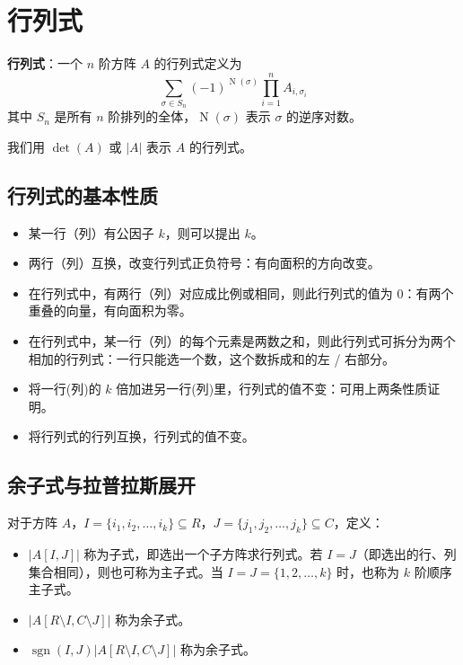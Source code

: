\section{行列式}

\begin{tcolorbox}
    \textbf{行列式}：一个 $n$ 阶方阵 $A$ 的行列式定义为
    $$\sum_{\sigma\in S_n} (-1)^{\operatorname{N}(\sigma)}\prod_{i=1}^{n} A_{i,\sigma_i}$$
    其中 $S_n$ 是所有 $n$ 阶排列的全体，$\operatorname{N}(\sigma)$ 表示 $\sigma$ 的逆序对数。

    我们用 $\det(A)$ 或 $|A|$ 表示 $A$ 的行列式。
\end{tcolorbox}

\subsection{行列式的基本性质}

\begin{itemize}
    \item 某一行（列）有公因子 $k$，则可以提出 $k$。
    \item 两行（列）互换，改变行列式正负符号：有向面积的方向改变。
    \item 在行列式中，有两行（列）对应成比例或相同，则此行列式的值为 $0$：有两个重叠的向量，有向面积为零。
    \item 在行列式中，某一行（列）的每个元素是两数之和，则此行列式可拆分为两个相加的行列式：一行只能选一个数，这个数拆成和的左 / 右部分。
    \item 将一行(列)的 $k$ 倍加进另一行(列)里，行列式的值不变：可用上两条性质证明。
    \item 将行列式的行列互换，行列式的值不变。
\end{itemize}

\subsection{余子式与拉普拉斯展开}

\begin{tcolorbox}
    对于方阵 $A$，$I=\{i_1,i_2,\ldots,i_k\}\subseteq R$，$J=\{j_1,j_2,\ldots,j_k\}\subseteq C$，定义：

    \begin{itemize}
        \item $|A[I,J]|$ 称为子式，即选出一个子方阵求行列式。若 $I=J$（即选出的行、列集合相同），则也可称为主子式。当 $I=J=\{1,2,\ldots,k\}$ 时，也称为 $k$ 阶顺序主子式。
        \item $|A[R\setminus I,C\setminus J]|$ 称为余子式。
        \item $\operatorname{sgn}(I,J)|A[R\setminus I,C\setminus J]|$ 称为余子式。
    \end{itemize}
\end{tcolorbox}

